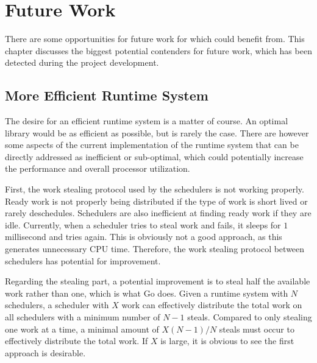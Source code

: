 

\chapter{Future Work}
\label{ch:future_work}


There are some opportunities for future work for which \Proxc{} could benefit from. This chapter discusses the biggest potential contenders for future work, which has been detected during the project development.


\section{More Efficient Runtime System}


The desire for an efficient runtime system is a matter of course. An optimal library would be as efficient as possible, but is rarely the case. There are however some aspects of the current implementation of the runtime system that can be directly addressed as inefficient or sub\hyp{}optimal, which could potentially increase the performance and overall processor utilization.

First, the work stealing protocol used by the schedulers is not working properly. Ready work is not properly being distributed if the type of work is short lived or rarely deschedules. Schedulers are also inefficient at finding ready work if they are idle. Currently, when a scheduler tries to steal work and fails, it sleeps for $1$ millisecond and tries again. This is obviously not a good approach, as this generates unnecessary CPU time. Therefore, the work stealing protocol between schedulers has potential for improvement.

Regarding the stealing part, a potential improvement is to steal half the available work rather than one, which is what Go does. Given a runtime system with $N$ schedulers, a scheduler with $X$ work can effectively distribute the total work on all schedulers with a minimum number of $N-1$ steals. Compared to only stealing one work at a time, a minimal amount of $X(N-1)/N$ steals must occur to effectively distribute the total work. If $X$ is large, it is obvious to see the first approach is desirable.

